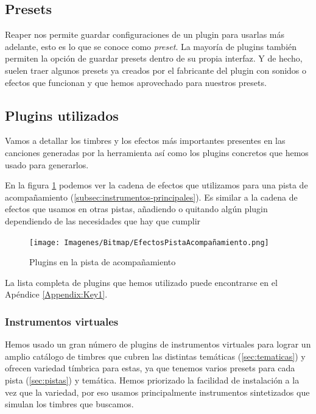\subsection{Presets}
Reaper nos permite guardar configuraciones de un plugin para usarlas más adelante, esto es lo que se conoce como \textit{preset}. La mayoría de plugins también permiten la opción de guardar presets dentro de su propia interfaz. Y de hecho, suelen traer algunos presets ya creados por el fabricante del plugin con sonidos o efectos que funcionan y que hemos aprovechado para nuestros presets.

\subsection{Plugins utilizados}\label{subsec:plugins-utilizados}
Vamos a detallar los timbres y los efectos más importantes presentes en las canciones generadas por la herramienta así como los plugins concretos que hemos usado para generarlos. 

En la figura \ref{fig:Efectos-acompañamiento} podemos ver la cadena de efectos que utilizamos para una pista de acompañamiento (\ref{subsec:instrumentos-principales}). Es similar a la cadena de efectos que usamos en otras pistas, añadiendo o quitando algún plugin dependiendo de las necesidades que hay que cumplir

\begin{figure}[h]
    \centering
    \texttt{[image: Imagenes/Bitmap/EfectosPistaAcompañamiento.png]}
    \caption{Plugins en la pista de acompañamiento}
    \label{fig:Efectos-acompañamiento}
\end{figure}

La lista completa de plugins que hemos utilizado puede encontrarse en el Apéndice \ref{Appendix:Key1}.

    \subsubsection{Instrumentos virtuales}\label{subsubsec:bluearp}
Hemos usado un gran número de plugins de instrumentos virtuales para lograr un amplio catálogo de timbres que cubren las distintas temáticas (\ref{sec:tematicas}) y ofrecen variedad tímbrica para estas, ya que tenemos varios presets para cada pista (\ref{sec:pistas}) y temática. Hemos priorizado la facilidad de instalación a la vez que la variedad, por eso usamos principalmente instrumentos sintetizados que simulan los timbres que buscamos.

